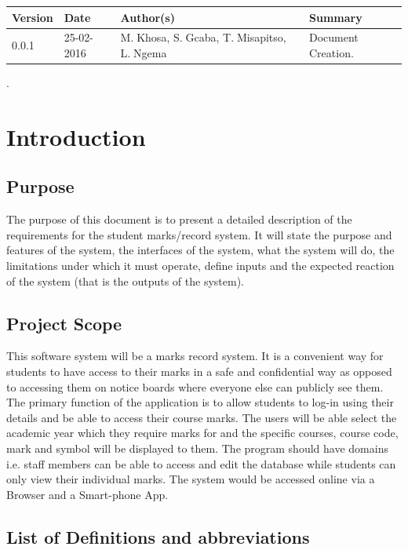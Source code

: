 \documentclass[10pt,onecolumn]{RequimentsGathering}
\begin{document}
\begin{center}
    \begin{tabular}{ | p{2cm} | p{3cm} | p{5cm} | p{5cm} |}
    \hline
    \textbf{Version}& \textbf{Date}& \textbf{Author(s)} & \textbf{Summary} \\ \hline
    0.0.1 & 25-02-2016 & M.$\;$Khosa, S.$\;$Gcaba, T.$\;$Misapitso, L.$\;$Ngema& Document Creation. \\ \hline

    \end{tabular}
\end{center}

\newpage


%
\pagestyle{plain}.
\section{Introduction}
\subsection{Purpose}

The purpose of this document is to present a detailed description of the requirements for the student marks/record system. It will state the purpose and features of the system, the interfaces of the system, what the system will do, the limitations under which it must operate, define inputs and the expected reaction of the system (that is the outputs of the system). 
\subsection{Project Scope}
This software system will be a marks record system. It is a convenient way for students to have access to their marks in a safe and confidential way as opposed to accessing them on notice boards where everyone else can publicly see them. The primary function of the application is to allow students to log-in using their details and be able to access their course marks. The users will be able select the academic year which they require marks for and the specific courses, course code, mark and symbol will be displayed to them. The program should have domains i.e. staff members can be able to access and edit the database while students can only view their individual marks. The system would be accessed online via a Browser and a Smart-phone App.
\subsection{List of Definitions and abbreviations}
\end{document}
